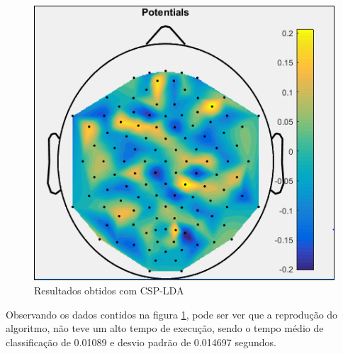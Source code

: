 \pagebreak
\begin{figure}[h]
	\centering
	\includegraphics[keepaspectratio=true,scale=0.5]{figuras/image_csp_matlab.png}
	\caption{Resultados obtidos  com CSP-LDA}
	\label{resultadoLotte}
\end{figure}

Observando os dados contidos na figura \ref{resultadoLotte}, pode ser ver que a reprodução do algoritmo, não teve um alto tempo de execução, sendo o tempo médio de classificação de 0.01089 e desvio padrão de 0.014697 segundos. 